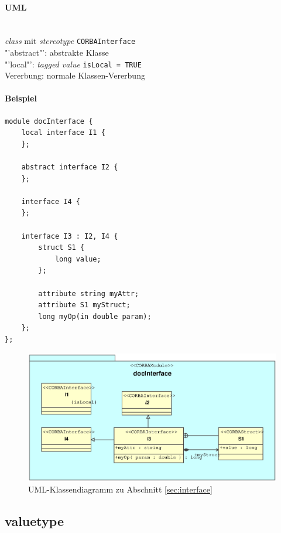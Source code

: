 \documentclass [a4paper,10pt] {scrartcl}
\begin{document}
\paragraph{UML}~\\
\emph{class} mit \emph{stereotype} \texttt{CORBAInterface}\\
"'abstract"': abstrakte Klasse\\
"'local"': \emph{tagged value} \texttt{isLocal = TRUE}\\
Vererbung: normale Klassen-Vererbung\\
\paragraph{Beispiel}
\begin{verbatim}
module docInterface {
    local interface I1 {
    };

    abstract interface I2 {
    };

    interface I4 {
    };

    interface I3 : I2, I4 {
        struct S1 {
            long value;
        };

        attribute string myAttr;
        attribute S1 myStruct;
        long myOp(in double param);
    };
};
\end{verbatim}
\begin{figure}[!h]
\centerline{\includegraphics[width=1.2 \linewidth]{docInterface.eps}}
\caption{UML-Klassendiagramm zu Abschnitt \ref{sec:interface}}
\label{fig:interface}
\end{figure}

\cleardoublepage
\subsection{valuetype}
\label{sec:valuetype}
\end{document}
